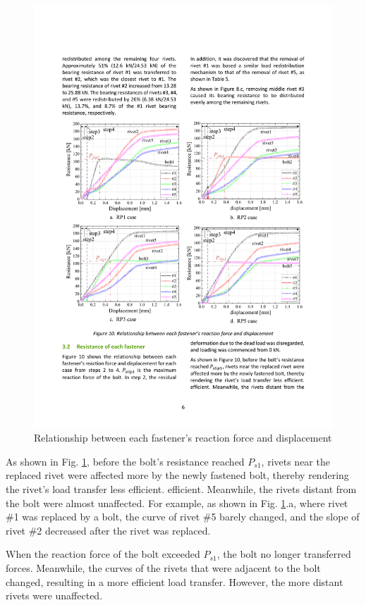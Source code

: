 \begin{figure}[htbp]
    \centering
    \includegraphics[width=\textwidth]{imgs/ch4/fig-l10.pdf}
    \caption{Relationship between each fastener's reaction force and displacement}
    \label{fig-l10}
\end{figure}

As shown in Fig. \ref{fig-l10}, before the bolt's resistance reached $P_{s1}$, rivets near the replaced rivet were affected more by the newly fastened bolt, thereby rendering the rivet's load transfer less efficient. efficient. Meanwhile, the rivets distant from the bolt were almost unaffected. For example, as shown in Fig. \ref{fig-l10}.a, where rivet \#1 was replaced by a bolt, the curve of rivet \#5 barely changed, and the slope of rivet \#2 decreased after the rivet was replaced.

When the reaction force of the bolt exceeded $P_{s1}$, the bolt no longer transferred forces. Meanwhile, the curves of the rivets that were adjacent to the bolt changed, resulting in a more efficient load transfer. However, the more distant rivets were unaffected.

